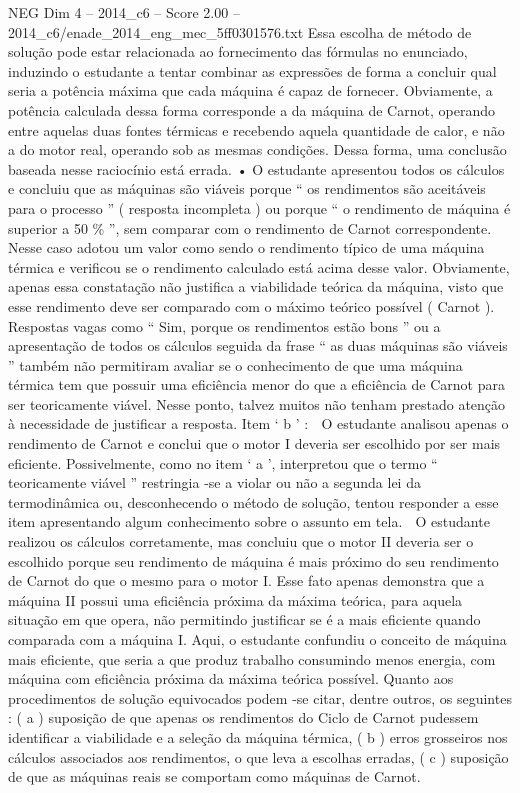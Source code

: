 \begin{textsample}{NEG Dim 4 – 2014\_c6 – Score 2.00 – 2014\_c6/enade\_2014\_eng\_mec\_5ff0301576.txt}
Essa escolha de método de solução pode estar relacionada ao fornecimento das fórmulas no enunciado, induzindo o estudante a tentar combinar as expressões de forma a concluir qual seria a potência máxima que cada máquina é capaz de fornecer.
Obviamente, a potência calculada dessa forma corresponde a da máquina de Carnot, operando entre aquelas duas fontes térmicas e recebendo aquela quantidade de calor, e não a do motor real, operando sob as mesmas condições.
Dessa forma, uma conclusão baseada nesse raciocínio está errada. • O estudante apresentou todos os cálculos e concluiu que as máquinas são viáveis porque “ os rendimentos são aceitáveis para o processo ” ( resposta incompleta ) ou porque “ o rendimento de máquina é superior a 50 \% ”, sem comparar com o rendimento de Carnot correspondente.
Nesse caso adotou um valor como sendo o rendimento típico de uma máquina térmica e verificou se o rendimento calculado está acima desse valor.
Obviamente, apenas essa constatação não justifica a viabilidade teórica da máquina, visto que esse rendimento deve ser comparado com o máximo teórico possível ( Carnot ).  Respostas vagas como “ Sim, porque os rendimentos estão bons ” ou a apresentação de todos os cálculos seguida da frase “ as duas máquinas são viáveis ” também não permitiram avaliar se o conhecimento de que uma máquina térmica tem que possuir uma eficiência menor do que a eficiência de Carnot para ser teoricamente viável.
Nesse ponto, talvez muitos não tenham prestado atenção à necessidade de justificar a resposta.
Item ‘ b ’ :  O estudante analisou apenas o rendimento de Carnot e conclui que o motor I deveria ser escolhido por ser mais eficiente.
Possivelmente, como no item ‘ a ’, interpretou que o termo “ teoricamente viável ” restringia -se a violar ou não a segunda lei da termodinâmica ou, desconhecendo o método de solução, tentou responder a esse item apresentando algum conhecimento sobre o assunto em tela.  O estudante realizou os cálculos corretamente, mas concluiu que o motor II deveria ser o escolhido porque seu rendimento de máquina é mais próximo do seu rendimento de Carnot do que o mesmo para o motor I.
Esse fato apenas demonstra que a máquina II possui uma eficiência próxima da máxima teórica, para aquela situação em que opera, não permitindo justificar se é a mais eficiente quando comparada com a máquina I.
Aqui, o estudante confundiu o conceito de máquina mais eficiente, que seria a que produz trabalho consumindo menos energia, com máquina com eficiência próxima da máxima teórica possível.
Quanto aos procedimentos de solução equivocados podem -se citar, dentre outros, os seguintes : ( a ) suposição de que apenas os rendimentos do Ciclo de Carnot pudessem identificar a viabilidade e a seleção da máquina térmica, ( b ) erros grosseiros nos cálculos associados aos rendimentos, o que leva a escolhas erradas, ( c ) suposição de que as máquinas reais se comportam como máquinas de Carnot.

\end{textsample}
